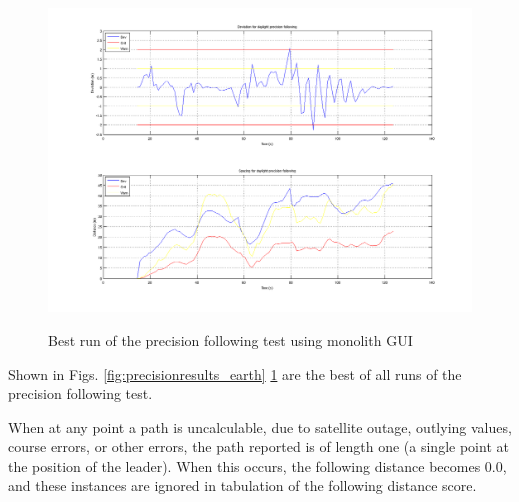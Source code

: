 \begin{figure}[ht] \centering \label{fig:precisionresults_monolith}
    \includegraphics[width=5in]{./figs/dst_dev_monolith_tracklap.png}
    \caption{Best run of the precision following test using monolith GUI}
\end{figure}

Shown in Figs. \ref{fig:precisionresults_earth} \ref{fig:precisionresults_monolith} are the best of all runs of the precision following test. 

When at any point a path is uncalculable, due to satellite outage, outlying values, course errors, or other errors, the path reported is of length one (a single point at the position of the leader). When this occurs, the following distance becomes 0.0, and these instances are ignored in tabulation of the following distance score.

